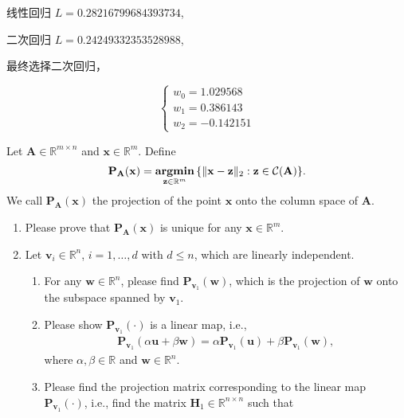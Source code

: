 \documentclass[11pt,letter,notitlepage]{article}
\newcommand{\proj}[2]{\textbf{P}_{#2} (#1)}
\DeclareMathOperator*{\argmin}{\bf argmin}
\begin{document}
\begin{solution}
\begin{enumerate}
              线性回归 $L=0.28216799684393734$,

              二次回归 $L=0.24249332353528988$,

              最终选择二次回归，

              $$\begin{cases}
                      w_0=1.029568 \\
                      w_1=0.386143 \\
                      w_2=-0.142151
                  \end{cases}$$

    \end{enumerate}
\end{solution}
\newpage


\begin{exercise}
    Let $\mathbf{A}\in\mathbb{R}^{m\times n}$ and $\mathbf{x} \in \mathbb{R}^m$. Define
    \begin{align*}
        \proj{\mathbf{x}}{\mathbf{A}} = \argmin_{\mathbf{z}\in\mathbb{R}^m}\,\{\|\mathbf{x}-\mathbf{z}\|_2: \mathbf{z}\in\mathcal{C}(\mathbf{A})\}.
    \end{align*}
    We call $\proj{\mathbf{x}}{\mathbf{A}}$ the projection of the point $\mathbf{x}$ onto the column space of $\mathbf{A}$.
    \begin{enumerate}
        \item Please prove that $\mathbf{P}_{\mathbf{A}}(\mathbf{x})$ is unique for any $\mathbf{x} \in \mathbb{R}^m$.
        \item Let $\mathbf{v}_i \in \mathbb{R}^n$, $i=1,\ldots,d$ with $d\leq n$, which are linearly independent.
              \begin{enumerate}
                  \item For any $\mathbf{w}\in \mathbb{R}^n$, please find $\proj{\mathbf{w}}{\mathbf{v}_1}$, which is the projection of $\mathbf{w}$ onto the subspace spanned by $\mathbf{v}_1$.
                  \item Please show $\proj{\cdot}{\mathbf{v}_1}$ is a linear map, i.e.,
                        \begin{align*}
                            \proj{\alpha\mathbf{u}+\beta\mathbf{w}}{\mathbf{v}_1}=\alpha\proj{\mathbf{u}}{\mathbf{v}_1} + \beta \proj{\mathbf{w}}{\mathbf{v}_1},
                        \end{align*}
                        where $\alpha,\beta\in\mathbb{R}$ and $\mathbf{w}\in\mathbb{R}^n$.
                  \item Please find the projection matrix corresponding to the linear map $\proj{\cdot}{\mathbf{v}_1}$, i.e., find the matrix $\mathbf{H}_1\in\mathbb{R}^{n\times n}$ such that

\end{enumerate}
\end{enumerate}
\end{exercise}
\end{document}
